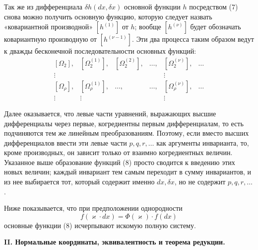 \documentclass[11pt]{article}
\begin{document}
Так же из дифференциала \(\delta h(dx,\delta x)\) основной функции \(h\) посредством (7) снова можно получить основную функцию, которую следует назвать «ковариантной производной» \([h^{(1)}]\) от \(h\); вообще \([h^{(\nu)}]\) будет обозначать ковариантную производную от \([h^{(\nu-1)}]\). Эти два процесса таким образом ведут к дважды бесконечной последовательности основных функций:
\begin{equation}
\begin{array}{cccccc}
[\Omega_2], & [\Omega_2^{(1)}], & [\Omega_2^{(2)}], & \ldots,
& [\Omega_2^{(\nu)}], & \ldots\\
\vdots &&&& \vdots&\\
{}[\Omega_\rho], & [\Omega_\rho^{(1)}], & \ldots, & \ldots,
& [\Omega_\rho^{(\nu)}], & \ldots\\
\vdots & \vdots &&& \vdots&
\end{array}
\tag{8}
\end{equation}

Далее оказывается, что левые части уравнений, выражающих высшие дифференциалы через первые, когредиентны первым дифференциалам, то есть подчиняются тем же линейным преобразованиям. Поэтому, если вместо высших дифференциалов ввести эти левые части \(p,q,r,\ldots\) как аргументы инварианта, то, кроме производных, он зависит только от взаимно когредиентных величин. Указанное выше образование функций (8) просто сводится к введению этих новых величин; каждый инвариант тем самым переходит в сумму инвариантов, и из нее выбирается тот, который содержит именно \(dx,\delta x\), но не содержит \(p,q,r,\ldots\).

Ниже показывается, что при предположении однородности
\[
f(\varkappa\cdot dx)=\Phi(\varkappa)\cdot f(dx)
\]
основные функции (8) исчерпывают искомую полную систему.

\begin{center}
\textbf{II. Нормальные координаты, эквивалентность и теорема редукции.}
\end{center}
\end{document}
